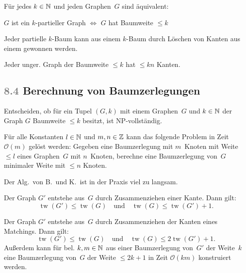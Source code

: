 \documentclass{cheat-sheet}
\renewcommand{\O}{\mathcal{O}} %
\DeclareMathOperator{\treewidth}{tw} %
\newcommand{\scriptSection}[1]{\textcolor{gray}{#1}\enspace}
\begin{document}
\begin{satz}
  Für jedes $k \in \mathbb{N}$ und jeden Graphen~$G$ sind äquivalent:
  \begin{center}
    $G$ ist ein $k$-partieller Graph $\iff$ $G$ hat Baumweite $\leq k$
  \end{center}
\end{satz}

\begin{lem}
  Jeder partielle $k$-Baum kann aus einem $k$-Baum durch Löschen von Kanten aus einem gewonnen werden.
\end{lem}

\begin{lem}
  Jeder unger. Graph der Baumweite $\leq k$ hat $\leq k n$ Kanten.
\end{lem}

\subsection{\scriptSection{8.4} Berechnung von Baumzerlegungen}

\begin{bem}
  Entscheiden, ob für ein Tupel $(G, k)$ mit einem Graphen~$G$ und $k \in \mathbb{N}$ der Graph $G$ Baumweite $\leq k$ besitzt, ist NP-vollständig.
\end{bem}

\begin{lem}
  Für alle Konstanten $l \in \mathbb{N}$ und $m, n \in \mathbb{Z}$ kann das folgende Problem in Zeit~$\O(m)$ gelöst werden:
  Gegeben eine Baumzerlegung mit $m$~Knoten mit Weite $\leq l$ eines Graphen~$G$ mit $n$~Knoten, berechne eine Baumzerlegung von~$G$ minimaler Weite mit $\leq n$ Knoten.
\end{lem}

\begin{bem}
  Der Alg.\ von B.\ und K.\ ist in der Praxis viel zu langsam.
\end{bem}

\begin{lem}
  Der Graph $G'$ entstehe aus~$G$ durch Zusammenziehen einer Kante.
  Dann gilt:
  \[
    \treewidth(G') \leq \treewidth(G)
    \quad \text{und} \quad
    \treewidth(G) \leq \treewidth(G') + 1.
  \]
\end{lem}

\begin{lem}
  Der Graph $G'$ entstehe aus~$G$ durch Zusammenziehen der Kanten eines Matchings.
  Dann gilt:
  \[
    \treewidth(G') \leq \treewidth(G)
    \quad \text{und} \quad
    \treewidth(G) \leq 2 \treewidth(G') + 1.
  \]
  Außerdem kann für bel. $k, m \in \mathbb{N}$ aus einer Baumzerlegung von~$G'$ der Weite~$k$ eine Baumzerlegung von~$G$ der Weite $\leq 2 k + 1$ in Zeit $\O(k m)$ konstruiert werden.
\end{lem}
\end{document}
